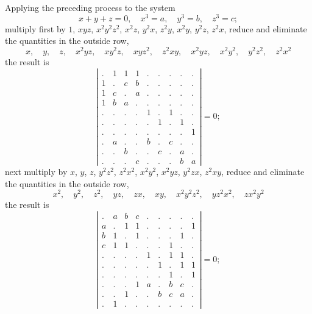 \documentclass[11pt,a4paper]{book}
\begin{document}
Applying the preceding process to the system
\[
x + y + z = 0, \quad x^3 = a, \quad y^3 = b, \quad z^3 = c;
\]
multiply first by $1$, $xyz$, $x^2y^2z^2$, $x^2z$, $y^2x$, $z^2y$, $x^2y$, $y^2z$, $z^2x$, reduce and eliminate the quantities in the outside row,
\[
x, \quad y, \quad z, \quad x^2yz, \quad xy^2z, \quad xyz^2, \quad z^2xy, \quad x^2yz, \quad x^2y^2, \quad y^2z^2, \quad z^2x^2
\]
the result is
\[
\left|\begin{array}{ccc|ccc|ccc}
. & 1 & 1 & 1 & . & . & . & . & . \\
1 & . & c & b & . & . & . & . & . \\
1 & c & . & a & . & . & . & . & . \\
1 & b & a & . & . & . & . & . & . \\
\hline
. & . & . & . & 1 & . & 1 & . & . \\
. & . & . & . & . & 1 & . & 1 & . \\
. & . & . & . & . & . & . & . & 1 \\
\hline
. & a & . & . & b & . & c & . & . \\
. & . & b & . & . & c & . & a & . \\
. & . & . & c & . & . & . & b & a
\end{array}\right| = 0;
\]
next multiply by $x$, $y$, $z$, $y^2z^2$, $z^2x^2$, $x^2y^2$, $x^2yz$, $y^2zx$, $z^2xy$, reduce and eliminate the quantities in the outside row,
\[
x^2, \quad y^2, \quad z^2, \quad yz, \quad zx, \quad xy, \quad x^2y^2z^2, \quad yz^2x^2, \quad zx^2y^2
\]
the result is
\[
\left|\begin{array}{ccc|ccc|ccc}
. & a & b & c & . & . & . & . & . \\
a & . & 1 & 1 & . & . & . & . & 1 \\
b & 1 & . & 1 & . & . & . & 1 & . \\
c & 1 & 1 & . & . & . & 1 & . & . \\
\hline
. & . & . & . & 1 & . & 1 & 1 & . \\
. & . & . & . & . & 1 & . & 1 & 1 \\
. & . & . & . & . & . & 1 & . & 1 \\
\hline
. & . & . & 1 & a & . & b & c & . \\
. & . & 1 & . & . & b & c & a & . \\
. & 1 & . & . & . & . & . & . & .
\end{array}\right| = 0;
\]

\newpage
\setcounter{page}{44}
\end{document}
